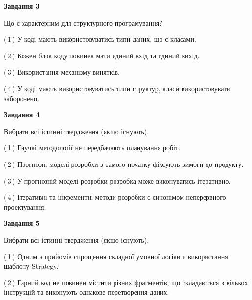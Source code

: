\documentclass[10pt, ukrainian]{article}
\begin{document}
{\begin {large}
{\begin {center}\textbf{Завдання 3}\end {center}}\par
Що є характерним для структурного програмування?\par
\vspace{2mm}



(\,1\,) У коді мають використовуватись типи даних, що є класами. %



(\,2\,) Кожен блок коду повинен мати єдиний вхід та єдиний вихід.%



(\,3\,) Використання механізму винятків. %



(\,4\,) У коді мають використовуватись типи структур, класи використовувати заборонено. %


{\begin {center}\textbf{Завдання 4}\end {center}}\par
Вибрати всі істинні твердження (якщо існують).\par
\vspace{2mm}



(\,1\,) Гнучкі методології не передбачають планування робіт. %



(\,2\,) Прогнозні моделі розробки з самого початку фіксують вимоги до продукту. %



(\,3\,) У прогнозній моделі розробки розробка може виконуватись ітеративно. %



(\,4\,) Ітеративні та інкрементні методи розробки є синонімом неперервного проектування. %


{\begin {center}\textbf{Завдання 5}\end {center}}\par
Вибрати всі істинні твердження (якщо існують).\par
\vspace{2mm}



(\,1\,) Одним з прийомів спрощення складної умовної логіки є використання шаблону Strategy. %



(\,2\,) Гарний код не повинен містити різних фрагментів, що складаються з кількох інструкцій та виконують однакове перетворення даних. %




\end{large}}
\end{document}
